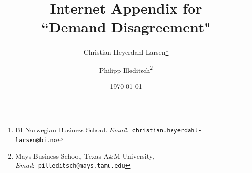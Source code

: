 \begin{titlepage}

  \singlespace {} \setcounter{tmark}{1}
  \renewcommand{\thefootnote}{\fnsymbol{footnote}}
\title{Internet Appendix for \\ ``Demand Disagreement"}
\author{{Christian Heyerdahl-Larsen}\thanks{BI Norwegian Business School. {\it Email}:~{\tt christian.heyerdahl-larsen@bi.no}}   \and  {Philipp Illeditsch}\thanks{Mays Business School, Texas A\&M University, {\it Email}:~\texttt{pilleditsch@mays.tamu.edu}}}
\end{titlepage}

    \date{\today}
\maketitle
